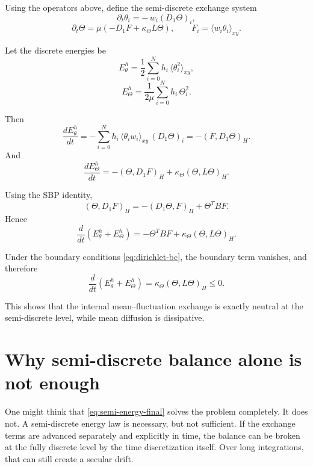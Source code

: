 \documentclass[11pt]{article}
\begin{document}
Using the operators above, define the semi-discrete exchange system
\begin{equation}
\partial_t \theta_i
=
-\,w_i (D_1\Theta)_i,
\label{eq:theta-semi-fd}
\end{equation}
\begin{equation}
\partial_t \Theta
=
\mu\left(
- D_1 F
+ \kappa_\Theta L\Theta
\right),
\qquad
F_i = \langle w_i\theta_i\rangle_{xy}.
\label{eq:Theta-semi-fd}
\end{equation}

Let the discrete energies be
\begin{equation}
E_\theta^h
=
\frac12
\sum_{i=0}^N
h_i \,\langle \theta_i^2\rangle_{xy},
\label{eq:Etheta-h}
\end{equation}
\begin{equation}
E_\Theta^h
=
\frac{1}{2\mu}
\sum_{i=0}^N
h_i \,\Theta_i^2.
\label{eq:ETheta-h}
\end{equation}

Then
\[
\frac{dE_\theta^h}{dt}
=
-
\sum_{i=0}^N
h_i\,\langle \theta_i w_i\rangle_{xy}\,(D_1\Theta)_i
=
-(F,D_1\Theta)_H.
\]
And
\[
\frac{dE_\Theta^h}{dt}
=
-(\Theta,D_1F)_H
+
\kappa_\Theta(\Theta,L\Theta)_H.
\]

Using the SBP identity,
\[
(\Theta,D_1F)_H
=
-(D_1\Theta,F)_H + \Theta^T B F.
\]
Hence
\[
\frac{d}{dt}(E_\theta^h + E_\Theta^h)
=
-\Theta^T B F
+
\kappa_\Theta(\Theta,L\Theta)_H.
\]

Under the boundary conditions \eqref{eq:dirichlet-bc}, the boundary term vanishes, and therefore
\begin{equation}
\frac{d}{dt}(E_\theta^h + E_\Theta^h)
=
\kappa_\Theta(\Theta,L\Theta)_H
\le 0.
\label{eq:semi-energy-final}
\end{equation}

This shows that the internal mean--fluctuation exchange is exactly neutral at the semi-discrete level, while mean diffusion is dissipative.

\section{Why semi-discrete balance alone is not enough}

One might think that \eqref{eq:semi-energy-final} solves the problem completely. It does not. A semi-discrete energy law is necessary, but not sufficient. If the exchange terms are advanced separately and explicitly in time, the balance can be broken at the fully discrete level by the time discretization itself. Over long integrations, that can still create a secular drift.
\end{document}
